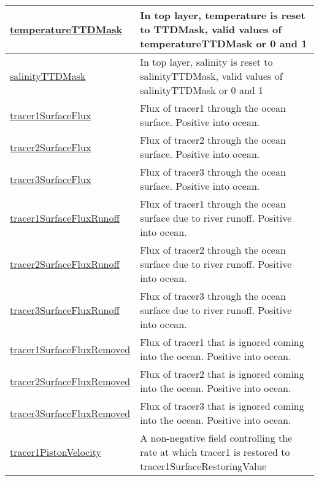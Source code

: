 {\begin{center}
\begin{longtable}{| p{2.0in} | p{4.0in} |}
    \hline
    \hyperref[subsec:var_sec_forcing_temperatureTTDMask]{temperatureTTDMask} & In top layer, temperature is reset to TTDMask, valid values of temperatureTTDMask or 0 and 1 \\
    \hline
    \hyperref[subsec:var_sec_forcing_salinityTTDMask]{salinityTTDMask} & In top layer, salinity is reset to salinityTTDMask, valid values of salinityTTDMask or 0 and 1 \\
    \hline
    \hyperref[subsec:var_sec_forcing_tracer1SurfaceFlux]{tracer1SurfaceFlux} & Flux of tracer1 through the ocean surface. Positive into ocean. \\
    \hline
    \hyperref[subsec:var_sec_forcing_tracer2SurfaceFlux]{tracer2SurfaceFlux} & Flux of tracer2 through the ocean surface. Positive into ocean. \\
    \hline
    \hyperref[subsec:var_sec_forcing_tracer3SurfaceFlux]{tracer3SurfaceFlux} & Flux of tracer3 through the ocean surface. Positive into ocean. \\
    \hline
    \hyperref[subsec:var_sec_forcing_tracer1SurfaceFluxRunoff]{tracer1SurfaceFluxRunoff} & Flux of tracer1 through the ocean surface due to river runoff. Positive into ocean. \\
    \hline
    \hyperref[subsec:var_sec_forcing_tracer2SurfaceFluxRunoff]{tracer2SurfaceFluxRunoff} & Flux of tracer2 through the ocean surface due to river runoff. Positive into ocean. \\
    \hline
    \hyperref[subsec:var_sec_forcing_tracer3SurfaceFluxRunoff]{tracer3SurfaceFluxRunoff} & Flux of tracer3 through the ocean surface due to river runoff. Positive into ocean. \\
    \hline
    \hyperref[subsec:var_sec_forcing_tracer1SurfaceFluxRemoved]{tracer1SurfaceFluxRemoved} & Flux of tracer1 that is ignored coming into the ocean. Positive into ocean. \\
    \hline
    \hyperref[subsec:var_sec_forcing_tracer2SurfaceFluxRemoved]{tracer2SurfaceFluxRemoved} & Flux of tracer2 that is ignored coming into the ocean. Positive into ocean. \\
    \hline
    \hyperref[subsec:var_sec_forcing_tracer3SurfaceFluxRemoved]{tracer3SurfaceFluxRemoved} & Flux of tracer3 that is ignored coming into the ocean. Positive into ocean. \\
    \hline
    \hyperref[subsec:var_sec_forcing_tracer1PistonVelocity]{tracer1PistonVelocity} & A non-negative field controlling the rate at which tracer1 is restored to tracer1SurfaceRestoringValue \\

\end{longtable}
\end{center}}
